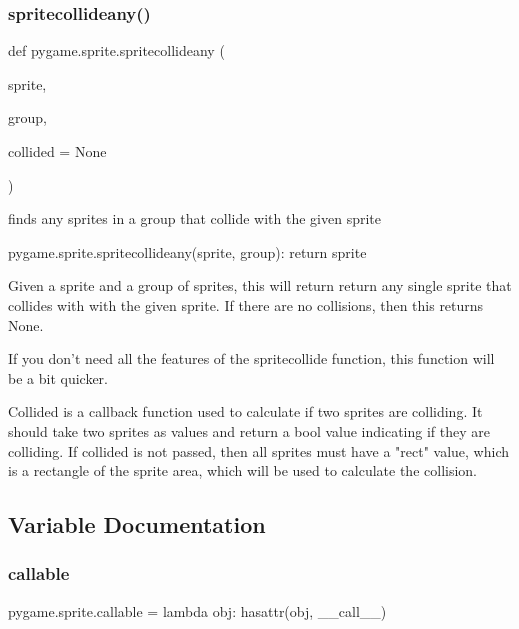 \subsubsection{\texorpdfstring{spritecollideany()}{spritecollideany()}}
{\footnotesize\ttfamily def pygame.\+sprite.\+spritecollideany (\begin{DoxyParamCaption}\item[{}]{sprite,  }\item[{}]{group,  }\item[{}]{collided = {\ttfamily None} }\end{DoxyParamCaption})}

\begin{DoxyVerb}finds any sprites in a group that collide with the given sprite

pygame.sprite.spritecollideany(sprite, group): return sprite

Given a sprite and a group of sprites, this will return return any single
sprite that collides with with the given sprite. If there are no
collisions, then this returns None.

If you don't need all the features of the spritecollide function, this
function will be a bit quicker.

Collided is a callback function used to calculate if two sprites are
colliding. It should take two sprites as values and return a bool value
indicating if they are colliding. If collided is not passed, then all
sprites must have a "rect" value, which is a rectangle of the sprite area,
which will be used to calculate the collision.\end{DoxyVerb}
 

\subsection{Variable Documentation}
\mbox{\label{namespacepygame_1_1sprite_a800dcabe3c7d87b3e8f22bcbb204bf22}} 
\subsubsection{\texorpdfstring{callable}{callable}}
{\footnotesize\ttfamily pygame.\+sprite.\+callable = lambda obj\+: hasattr(obj, \textquotesingle{}\+\_\+\+\_\+call\+\_\+\+\_\+\textquotesingle{})}

\mbox{\label{namespacepygame_1_1sprite_a809335dc88fa487b290217358e9638d7}} 
